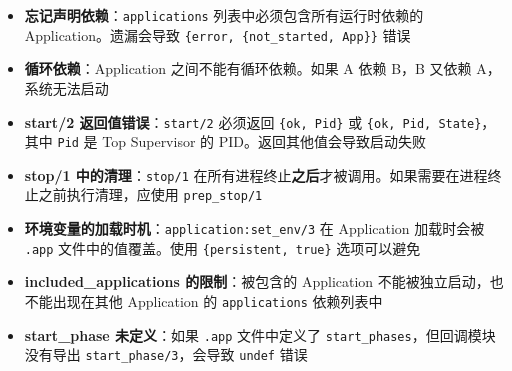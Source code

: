 \documentclass[a4paper,11pt]{article}
\begin{document}
\begin{itemize}[leftmargin=2em]
    \item \textbf{忘记声明依赖}：\texttt{applications} 列表中必须包含所有运行时依赖的 Application。遗漏会导致 \texttt{\{error, \{not\_started, App\}\}} 错误

    \item \textbf{循环依赖}：Application 之间不能有循环依赖。如果 A 依赖 B，B 又依赖 A，系统无法启动

    \item \textbf{start/2 返回值错误}：\texttt{start/2} 必须返回 \texttt{\{ok, Pid\}} 或 \texttt{\{ok, Pid, State\}}，其中 \texttt{Pid} 是 Top Supervisor 的 PID。返回其他值会导致启动失败

    \item \textbf{stop/1 中的清理}：\texttt{stop/1} 在所有进程终止\textbf{之后}才被调用。如果需要在进程终止之前执行清理，应使用 \texttt{prep\_stop/1}

    \item \textbf{环境变量的加载时机}：\texttt{application:set\_env/3} 在 Application 加载时会被 \texttt{.app} 文件中的值覆盖。使用 \texttt{\{persistent, true\}} 选项可以避免

    \item \textbf{included\_applications 的限制}：被包含的 Application 不能被独立启动，也不能出现在其他 Application 的 \texttt{applications} 依赖列表中

    \item \textbf{start\_phase 未定义}：如果 \texttt{.app} 文件中定义了 \texttt{start\_phases}，但回调模块没有导出 \texttt{start\_phase/3}，会导致 \texttt{undef} 错误
\end{itemize}
\end{document}
